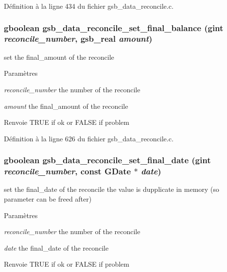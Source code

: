 Définition à la ligne 434 du fichier gsb\_\-data\_\-reconcile.c.

\subsubsection[{gsb\_\-data\_\-reconcile\_\-set\_\-final\_\-balance}]{\setlength{\rightskip}{0pt plus 5cm}gboolean gsb\_\-data\_\-reconcile\_\-set\_\-final\_\-balance (gint {\em reconcile\_\-number}, \/  {\bf gsb\_\-real} {\em amount})}\label{gsb__data__reconcile_8h_adad38ed6864de1c3da2e1bb7965b05a5}
set the final\_\-amount of the reconcile


\begin{DoxyParams}{Paramètres}
\item[{\em reconcile\_\-number}]the number of the reconcile \item[{\em amount}]the final\_\-amount of the reconcile\end{DoxyParams}
\begin{DoxyReturn}{Renvoie}
TRUE if ok or FALSE if problem 
\end{DoxyReturn}


Définition à la ligne 626 du fichier gsb\_\-data\_\-reconcile.c.

\subsubsection[{gsb\_\-data\_\-reconcile\_\-set\_\-final\_\-date}]{\setlength{\rightskip}{0pt plus 5cm}gboolean gsb\_\-data\_\-reconcile\_\-set\_\-final\_\-date (gint {\em reconcile\_\-number}, \/  const GDate $\ast$ {\em date})}\label{gsb__data__reconcile_8h_afbeb0c882101954a2b3717b2275bfe5e}
set the final\_\-date of the reconcile the value is dupplicate in memory (so parameter can be freed after)


\begin{DoxyParams}{Paramètres}
\item[{\em reconcile\_\-number}]the number of the reconcile \item[{\em date}]the final\_\-date of the reconcile\end{DoxyParams}
\begin{DoxyReturn}{Renvoie}
TRUE if ok or FALSE if problem 
\end{DoxyReturn}


